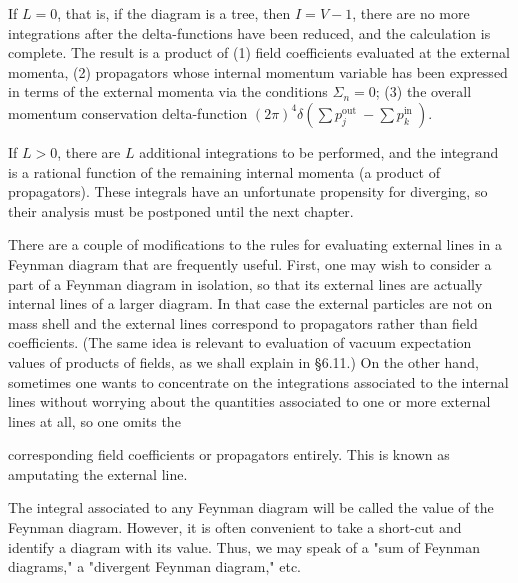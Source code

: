 \documentclass[10pt, letterpaper]{article}
\begin{document}
If $L=0$, that is, if the diagram is a tree, then $I=V-1$, there are no more integrations after the delta-functions have been reduced, and the calculation is complete. The result is a product of (1) field coefficients evaluated at the external momenta, (2) propagators whose internal momentum variable has been expressed in terms of the external momenta via the conditions $\Sigma_{n}=0$; (3) the overall momentum conservation delta-function $(2 \pi)^{4} \delta\left(\sum p_{j}^{\text {out }}-\sum p_{k}^{\text {in }}\right)$.

If $L>0$, there are $L$ additional integrations to be performed, and the integrand is a rational function of the remaining internal momenta (a product of propagators). These integrals have an unfortunate propensity for diverging, so their analysis must be postponed until the next chapter.

There are a couple of modifications to the rules for evaluating external lines in a Feynman diagram that are frequently useful. First, one may wish to consider a part of a Feynman diagram in isolation, so that its external lines are actually internal lines of a larger diagram. In that case the external particles are not on mass shell and the external lines correspond to propagators rather than field coefficients. (The same idea is relevant to evaluation of vacuum expectation values of products of fields, as we shall explain in §6.11.) On the other hand, sometimes one wants to concentrate on the integrations associated to the internal lines without worrying about the quantities associated to one or more external lines at all, so one omits the

corresponding field coefficients or propagators entirely. This is known as amputating the external line.

The integral associated to any Feynman diagram will be called the value of the Feynman diagram. However, it is often convenient to take a short-cut and identify a diagram with its value. Thus, we may speak of a "sum of Feynman diagrams," a "divergent Feynman diagram," etc.
\end{document}
